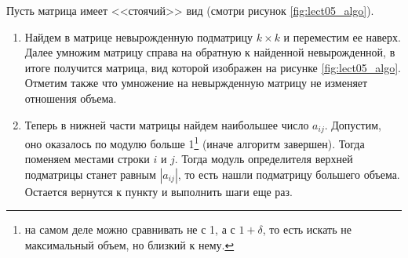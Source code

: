 Пусть матрица имеет <<стоячий>> вид (смотри рисунок \ref{fig:lect05_algo}).

\begin{enumerate}[label=\protect\circled{\arabic*}]
    \item Найдем в матрице невырожденную подматрицу $k\times k$ и переместим ее наверх. Далее умножим матрицу справа
          на обратную к найденной невырожденной, в итоге получится матрица, вид которой изображен на рисунке \ref{fig:lect05_algo}. Отметим также
          что умножение на невыржденную матрицу не изменяет отношения объема.
    \item Теперь в нижней части матрицы найдем наибольшее число $a_{ij}$. Допустим, оно оказалось по модулю больше 1\footnote{на самом деле 
    можно сравнивать не с 1, а с $1+\delta$, то есть искать не максимальный объем, но близкий к нему.} 
    (иначе алгоритм завершен). 
    Тогда поменяем местами строки $i$ и $j$. Тогда модуль определителя верхней подматрицы станет равным $|a_{ij}|$, то есть нашли подматрицу большего объема. 
    Остается вернутся к пункту \protect{} и выполнить шаги еще раз.
\end{enumerate}